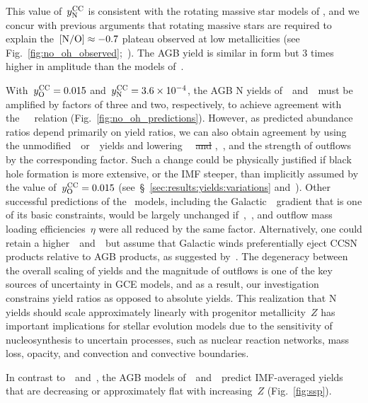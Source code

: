 \documentclass[ms.tex]{subfiles}
\begin{document}
This value of~$y_\text{N}^\text{CC}$ is consistent with the rotating massive star models of
\mbox{\citet{Limongi2018}}, and we concur with previous arguments that rotating
massive
stars are required to explain the~$\text{[N/O]} \approx -0.7$ plateau observed at low
metallicities (see Fig.~\ref{fig:no_oh_observed};~\citealp{Chiappini2003,
Chiappini2005, Chiappini2006, Kobayashi2011, Prantzos2018, Grisoni2021}).
The AGB yield is similar in form but 3 times higher in amplitude than the
models of~\cristallo.
\par
With~$y_\text{O}^\text{CC} = 0.015$ and~$y_\text{N}^\text{CC} = 3.6\times10^{-4}$, the AGB N yields
of~\cristallo~and~\ventura~must be amplified by factors of three and two,
respectively, to achieve agreement with
the~\mbox{\citet{Dopita2016}}~\ohno~relation (Fig.~\ref{fig:no_oh_predictions}).
However, as predicted abundance ratios depend primarily on yield ratios, we can
also obtain agreement by using the
{\color{red} unmodified}~\cristallo~or~\ventura~yields and
lowering~~{\color{red} \sout{and} ,}~, {\color{red} and the
strength of outflows} by the corresponding factor.
Such a change could be physically justified if black hole formation is more
extensive, or the IMF steeper, than implicitly assumed by the value
of~$y_\text{O}^\text{CC} = 0.015$ (see~\S~\ref{sec:results:yields:variations}
and~\mbox{\citealp{Griffith2021}}).
Other successful predictions of the~\mbox{\citet{Johnson2021}} models,
including the
Galactic~\oh~gradient that is one of its basic constraints, would be largely
unchanged if~,~, and outflow mass loading efficiencies~$\eta$
were all reduced by the same factor.
Alternatively, one could retain a higher~~and~~but assume that
Galactic winds preferentially eject CCSN products relative to AGB products, as
suggested by~\mbox{\citet{Vincenzo2016a}}.
The degeneracy between the overall scaling of yields and the magnitude of
outflows is one of the key sources of uncertainty in GCE models{\color{red},
and as a result, our investigation constrains yield ratios as opposed to
absolute yields.
This realization that N yields should scale approximately linearly with
progenitor metallicity~$Z$ has important implications for stellar evolution
models due to the sensitivity of nucleosynthesis to uncertain processes, such
as nuclear reaction networks, mass loss, opacity, and convection and convective
boundaries.
}
\par
In contrast to~\cristallo~and~\ventura, the AGB models
of~\karakasten~and~\karakas~predict IMF-averaged yields that are decreasing or
approximately flat with increasing~$Z$ (Fig.~\ref{fig:ssp}).
\end{document}
